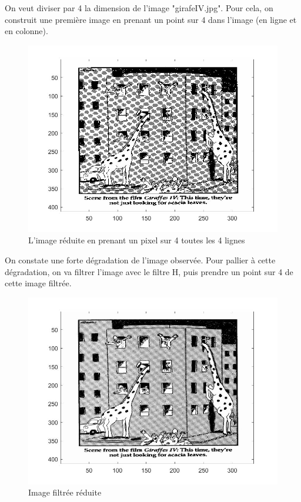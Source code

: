 \documentclass[10pt,a4paper]{article}
\begin{document}
On veut diviser par 4 la dimension de l'image "girafeIV.jpg". Pour cela, on construit une première image en prenant un point sur 4 dans l’image (en ligne et en colonne).


\begin{figure}[H]	\begin{center}
\includegraphics[scale=0.35]{girafe_reduite.jpg}
\caption{L'image réduite en prenant un pixel sur 4 toutes les 4 lignes}
\label{XX}
\end{center}	\end{figure}


On constate une forte dégradation de l'image observée. Pour pallier à cette dégradation, on va filtrer l'image avec le filtre H, puis prendre un point sur 4 de cette image filtrée.

\begin{figure}[H]	\begin{center}
\includegraphics[scale=0.35]{imfiltree_reduite.jpg}
\caption{Image filtrée réduite	}
\label{XX}
\end{center}	\end{figure}
\end{document}
